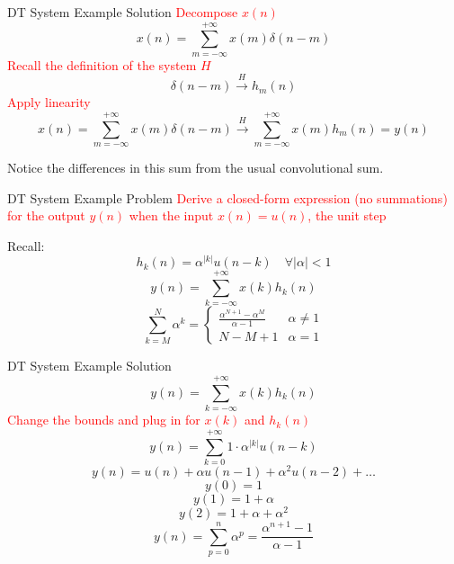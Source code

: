 \begin{frame}{DT System Example Solution}
    \textcolor{red}{Decompose $x(n)$}
    \[x(n) = \sum_{m=-\infty}^{+\infty}x(m)\delta(n-m)\]
    \textcolor{red}{Recall the definition of the system $H$}
    \[\delta(n-m) \overset{H}{\longrightarrow} h_m(n)\]
    \textcolor{red}{Apply linearity}
    \[x(n) = \sum_{m=-\infty}^{+\infty}x(m)\delta(n-m) \overset{H}{\longrightarrow} \sum_{m=-\infty}^{+\infty}x(m)h_m(n) = y(n)\]
    
    Notice the differences in this sum from the usual convolutional sum.
\end{frame}

\begin{frame}{DT System Example Problem}
    \textcolor{red}{Derive a closed-form expression (no summations) for the output $y(n)$ when the input $x(n) = u(n)$, the unit step}
    
    Recall:
    \[h_k(n) = \alpha^{|k|}u(n-k) \quad \forall |\alpha| < 1\]
    \[y(n) = \sum_{k=-\infty}^{+\infty}x(k)h_k(n)\]
    \[\sum_{k=M}^N \alpha^k = 
        \begin{cases}
            \frac{\alpha^{N+1}-\alpha^M}{\alpha-1} & \alpha\ne 1 \\
            N-M+1 & \alpha= 1
        \end{cases}
    \]
\end{frame}

\begin{frame}{DT System Example Solution}
    \[y(n) = \sum_{k=-\infty}^{+\infty}x(k)h_k(n)\]
    \textcolor{red}{Change the bounds and plug in for $x(k)$ and $h_k(n)$}
    \[y(n) = \sum_{k=0}^{+\infty}1\cdot \alpha^{|k|}u(n-k)\]
    \[y(n) = u(n) + \alpha u(n-1) + \alpha^2 u(n-2) + \dots\]
    \[y(0) = 1\]
    \[y(1) = 1+\alpha\]
    \[y(2) = 1+\alpha+\alpha^2\]
    \[y(n) = \sum_{p=0}^n \alpha^p = \frac{\alpha^{n+1}-1}{\alpha -1}\]
    
\end{frame}
